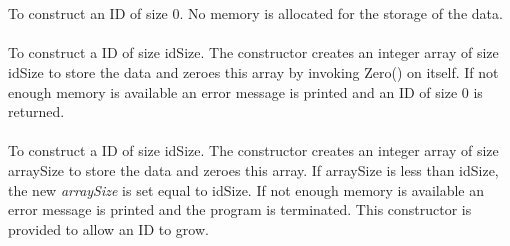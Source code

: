  \\
  \\ 
  \\
  \\
  \\
  \\ \\
 \\
\\  \\
  \\
 \\
 \\
 \\
 \\ \\
  \\
 \\
 \\
\\
 \\  
 \\ 



  \\
  \\
To construct an ID of size $0$. No memory is allocated for the storage
of the data. \\

  \\
To construct a ID of size \p idSize. The constructor creates an
integer array of size \p idSize to store the data and zeroes this
array by invoking Zero() on itself. If not enough memory is
available an error message is printed and an ID of size $0$ is
returned. \\  

  \\
To construct a ID of size \p idSize. The constructor creates an
integer array of size \p arraySize to store the data and zeroes
this array. If \p arraySize is less than \p idSize, the new {\em
arraySize} is set equal to \p idSize. If not enough memory is
available an error message is printed and the program is
terminated. This constructor is provided to allow an ID to grow. \\  

